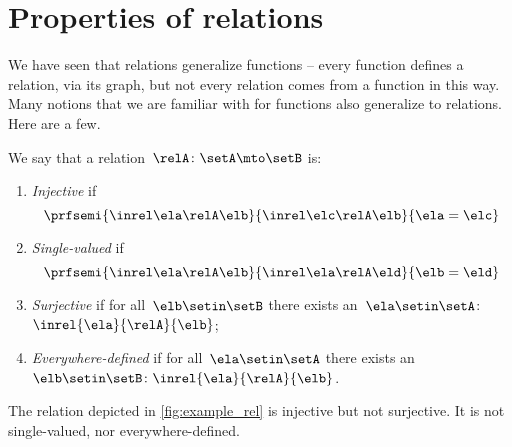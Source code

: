 
\section{Properties of relations}

We have seen that relations generalize functions -- every function defines a relation, via its graph, but not every relation comes from a function in this way.
Many notions that we are familiar with for functions also generalize to relations.
Here are a few.

\begin{ctdefinition}
    \label{def:rel_properties}
    We say that a relation~$\relA \colon \setA \mto \setB$ is:
    \begin{enumerate}
        \item \emph{Injective} if
              \begin{equation*}
                  \prfsemi{
                      \inrel \ela \relA \elb
                  }{
                      \inrel \elc \relA \elb
                  }{
                      \ela=\elc
                  }
              \end{equation*}
        \item \emph{Single-valued} if
              \begin{equation*}
                  \prfsemi{
                      \inrel \ela \relA \elb
                  }{
                      \inrel \ela \relA \eld
                  }{
                      \elb = \eld
                  }
              \end{equation*}
        \item \emph{Surjective} if for all~$\elb\setin \setB$ there exists an~$\ela\setin \setA$:~$\inrel{\ela}{\relA}{\elb}$;
        \item \emph{Everywhere-defined} if for all~$\ela\setin \setA$ there exists an ~$\elb \setin \setB\colon \inrel{\ela}{\relA}{\elb}$.
    \end{enumerate}
\end{ctdefinition}

\begin{example}
    The relation depicted in \cref{fig:example_rel} is injective but not surjective.
    It is not single-valued, nor everywhere-defined.
\end{example}

